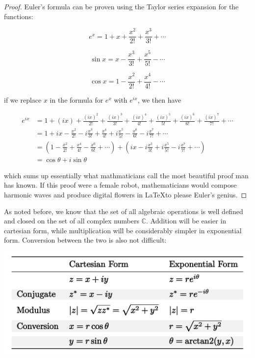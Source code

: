 \documentclass[12pt]{article}
\theoremstyle{definition}
\begin{document}
\begin{proof}
    Euler's formula can be proven using the Taylor series expansion for the functions:

    \[
    e^x = 1 + x + \frac{x^2}{2!} + \frac{x^3}{3!} + \cdots
    \]

    \[
    \sin x = x - \frac{x^3}{3!} + \frac{x^5}{5!} - \cdots
    \]

    \[
    \cos x = 1 - \frac{x^2}{2!} + \frac{x^4}{4!} - \cdots
    \]

    if we replace $x$ in the formula for $e^x$ with $e^{ix}$, we then have 

    \begin{align*}
    e^{ix} &= 1 + (ix) + \frac{(ix)^2}{2!} + \frac{(ix)^3}{3!} + \frac{(ix)^4}{4!} + \frac{(ix)^5}{5!} + \frac{(ix)^6}{6!} + \frac{(ix)^7}{7!} + \cdots \\
    &= 1 + i x - \frac{x^2}{2!} - i \frac{x^3}{3!} + \frac{x^4}{4!} + i \frac{x^5}{5!} - \frac{x^6}{6!} - i \frac{x^7}{7!} + \cdots \\
    &= \left(1 - \frac{x^2}{2!} + \frac{x^4}{4!} - \frac{x^6}{6!} + \cdots \right) + \left(i x - i \frac{x^3}{3!} + i \frac{x^5}{5!}- i \frac{x^7}{7!} + \cdots\right) \\
    &= \cos \theta + i \sin \theta
    \end{align*}

    which sums up essentially what mathmaticians call the most beautiful proof man has known. If this proof were a female robot, mathematicians would compose harmonic waves and produce digital flowers in \LaTeX to please Euler's genius. 
\end{proof}

As noted before, we know that the set of all algebraic operations is well defined and closed on the set of all complex numbers $\mathbb{C}$. Addition will be easier in cartesian form, while multiplication will be considerably simpler in exponential form. Conversion between the two is also not difficult:

\includegraphics[width=\textwidth]{3_cn2}
\end{document}
